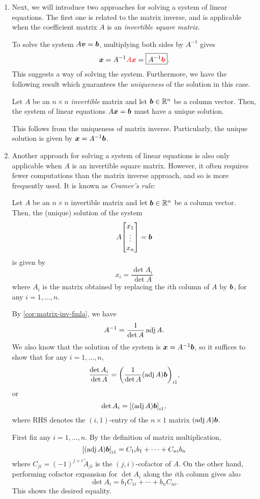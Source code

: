 \begin{enumerate}
\item \label{it:matrix-inv-solve-sle}
Next, we will introduce two approaches for solving a system of linear
equations. The first one is related to the matrix inverse, and is applicable
when the coefficient matrix \(A\) is an \emph{invertible square matrix}.

To solve the system \(A\vb*{v}=\vb*{b}\), multiplying both sides by
\(A^{-1}\) gives
\[
\vb*{x}=A^{-1}{\color{red}A\vb*{x}}=\boxed{A^{-1}{\color{red}\vb*{b}}}.
\]
This suggests a way of solving the system. Furthermore, we have the following
result which guarantees the \emph{uniqueness} of the solution in this case.

\begin{proposition}
\label{prp:inv-sle-unique}
Let \(A\) be an \(n\times n\) \emph{invertible} matrix and let \(\vb*{b}\in\mathbb{R}^n\) be a column
vector. Then, the system of linear equations \(A\vb*{x}=\vb*{b}\) must have a
unique solution.
\end{proposition}
\begin{pf}
This follows from the uniqueness of matrix inverse. Particularly, the unique
solution is given by \(\vb*{x}=A^{-1}\vb*{b}\).
\end{pf}

\item Another approach for solving a system of linear equations is also only
applicable when \(A\) is an invertible square matrix. However, it often
requires fewer computations than the matrix inverse approach, and so is more
frequently used. It is known as \emph{Cramer's rule}:
\begin{theorem}
\label{thm:cramer-rule}
Let \(A\) be an \(n\times n\) invertible matrix and let \(\vb*{b}\in\mathbb{R}^n\) be
a column vector. Then, the (unique) solution of the system
\[
A\mqty[x_1\\ \vdots\\ x_n]=\vect{b}
\]
is given by
\[
x_i=\frac{\det A_i}{\det A}
\]
where \(A_i\) is the matrix obtained by replacing the \(i\)th column of \(A\)
by \(\vb*{b}\), for any \(i=1,\dotsc,n\).
\end{theorem}
\begin{pf}
By \cref{cor:matrix-inv-fmla}, we have
\[
A^{-1}=\frac{1}{\det A}\operatorname{adj} A.
\]
We also know that the solution of the system is \(\vb*{x}=A^{-1}\vb*{b}\), so
it suffices to show that for any \(i=1,\dotsc,n\),
\[
\frac{\det A_i}{\det A}=\qty(\frac{1}{\det A}(\operatorname{adj} A)\vb*{b})_{i1},
\]
or
\[
\det A_i=\qty[(\operatorname{adj} A)\vb*{b}]_{i1},
\]
where RHS denotes the \((i,1)\)-entry of the \(n\times 1\) matrix
\((\operatorname{adj} A)\vb*{b}\).

First fix any \(i=1,\dotsc,n\). By the definition of matrix multiplication,
\[
\qty[(\operatorname{adj} A)\vb*{b}]_{i1}
=C_{1i}b_1+\dotsb+C_{ni}b_n
\]
where \(C_{ji}=(-1)^{j+i}\widetilde{A}_{ji}\) is the \((j,i)\)-cofactor of
\(A\). On the other hand, performing cofactor expansion for \(\det A_i\) along
the \(i\)th column gives also
\[
\det A_i=b_1C_{1i}+\dotsb+b_nC_{ni}.
\]
This shows the desired equality.
\end{pf}
\end{enumerate}
